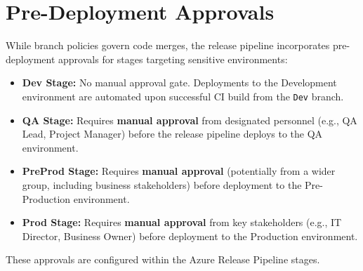 \begin{table}[htbp]
    \centering
    \caption{Branch Purposes and Policies Summary}
    \label{tab:BranchPoliciesSummary}
\end{table}

\section{Pre-Deployment Approvals}
\label{sec:PreDeploymentApprovals}

While branch policies govern code merges, the release pipeline incorporates pre-deployment approvals for stages targeting sensitive environments:

\begin{itemize}
    \item \textbf{Dev Stage:} No manual approval gate. Deployments to the Development environment are automated upon successful CI build from the \texttt{Dev} branch.
    \item \textbf{QA Stage:} Requires \textbf{manual approval} from designated personnel (e.g., QA Lead, Project Manager) before the release pipeline deploys to the QA environment.
    \item \textbf{PreProd Stage:} Requires \textbf{manual approval} (potentially from a wider group, including business stakeholders) before deployment to the Pre-Production environment.
    \item \textbf{Prod Stage:} Requires \textbf{manual approval} from key stakeholders (e.g., IT Director, Business Owner) before deployment to the Production environment.
\end{itemize}
These approvals are configured within the Azure Release Pipeline stages.

